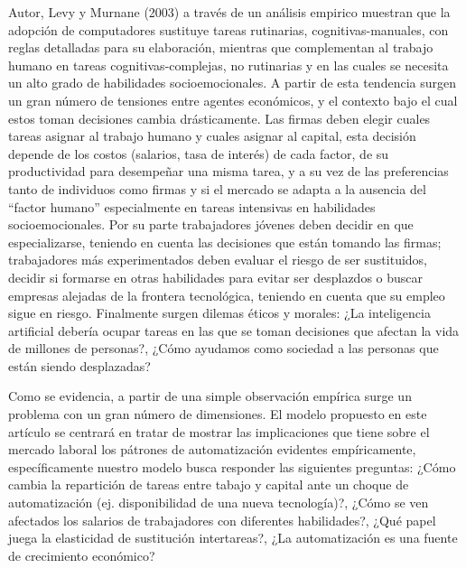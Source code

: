 \documentclass{article}
\theoremstyle{remark}
\theoremstyle{definition}
\begin{document}
Autor, Levy y Murnane (2003) a trav\'es de un an\'alisis empirico muestran que la adopci\'on de computadores sustituye tareas rutinarias, cognitivas-manuales, con reglas detalladas para su elaboraci\'on, mientras que complementan al trabajo humano en tareas cognitivas-complejas, no rutinarias y en las cuales se necesita un alto grado de habilidades socioemocionales. A partir de esta tendencia surgen un gran n\'umero de tensiones entre agentes econ\'omicos, y el contexto bajo el cual estos toman decisiones cambia dr\'asticamente. Las firmas deben elegir cuales tareas asignar al trabajo humano y cuales asignar al capital, esta decisi\'on depende de los costos (salarios, tasa de interés) de cada factor, de su productividad para desempeñar una misma tarea, y a su vez de las preferencias tanto de individuos como firmas y si el mercado se adapta a la ausencia del ``factor humano'' especialmente en tareas intensivas en habilidades socioemocionales. Por su parte trabajadores jóvenes deben decidir en que especializarse, teniendo en cuenta las decisiones que están tomando las firmas; trabajadores m\'as experimentados deben evaluar el riesgo de ser sustituidos, decidir si formarse en otras habilidades para evitar ser desplazdos o buscar empresas alejadas de la frontera tecnol\'ogica, teniendo en cuenta que su empleo sigue en riesgo. Finalmente surgen dilemas \'eticos y morales: ¿La inteligencia artificial deber\'ia ocupar tareas en las que se toman decisiones que afectan la vida de millones de personas?, ¿C\'omo ayudamos como sociedad a las personas que están siendo desplazadas?

Como se evidencia, a partir de una simple observaci\'on emp\'irica surge un problema con un gran n\'umero de dimensiones. El modelo propuesto en este art\'iculo se centrar\'a en tratar de mostrar las implicaciones que tiene sobre el mercado laboral los p\'atrones de automatizaci\'on evidentes empíricamente, específicamente nuestro modelo busca responder las siguientes preguntas: ¿C\'omo cambia la repartici\'on de tareas entre tabajo y capital ante un choque de automatizaci\'on (ej. disponibilidad de una nueva tecnolog\'ia)?, ¿C\'omo se ven afectados los salarios de trabajadores con diferentes habilidades?, ¿Qu\'e papel juega la elasticidad de sustituci\'on intertareas?, ¿La automatizaci\'on es una fuente de crecimiento econ\'omico?




\end{document}
